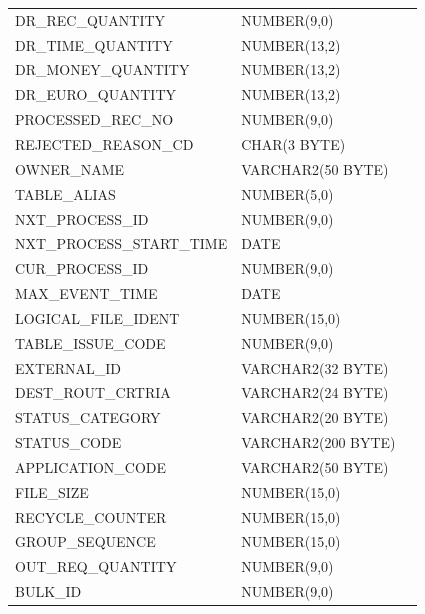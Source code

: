\documentclass[12pt,twoside]{article}
\begin{document}
\begin{longtable}{lll}
 DR\_REC\_QUANTITY             &  NUMBER(9,0)         &               \\
 DR\_TIME\_QUANTITY            &  NUMBER(13,2)        &               \\
 DR\_MONEY\_QUANTITY           &  NUMBER(13,2)        &               \\
 DR\_EURO\_QUANTITY            &  NUMBER(13,2)        &               \\
 PROCESSED\_REC\_NO            &  NUMBER(9,0)         &               \\
 REJECTED\_REASON\_CD          &  CHAR(3 BYTE)        &               \\
 OWNER\_NAME                   &  VARCHAR2(50 BYTE)   &               \\
 TABLE\_ALIAS                  &  NUMBER(5,0)         &               \\
 NXT\_PROCESS\_ID              &  NUMBER(9,0)         &               \\
 NXT\_PROCESS\_START\_TIME     &  DATE                &               \\
 CUR\_PROCESS\_ID              &  NUMBER(9,0)         &               \\
 MAX\_EVENT\_TIME              &  DATE                &               \\
 LOGICAL\_FILE\_IDENT          &  NUMBER(15,0)        &               \\
 TABLE\_ISSUE\_CODE            &  NUMBER(9,0)         &               \\
 EXTERNAL\_ID                  &  VARCHAR2(32 BYTE)   &               \\
 DEST\_ROUT\_CRTRIA            &  VARCHAR2(24 BYTE)   &               \\
 STATUS\_CATEGORY              &  VARCHAR2(20 BYTE)   &               \\
 STATUS\_CODE                  &  VARCHAR2(200 BYTE)  &               \\
 APPLICATION\_CODE             &  VARCHAR2(50 BYTE)   &               \\
 FILE\_SIZE                    &  NUMBER(15,0)        &               \\
 RECYCLE\_COUNTER              &  NUMBER(15,0)        &               \\
 GROUP\_SEQUENCE               &  NUMBER(15,0)        &               \\
 OUT\_REQ\_QUANTITY            &  NUMBER(9,0)         &               \\
 BULK\_ID                      &  NUMBER(9,0)         &               \\

\end{longtable}
\end{document}
